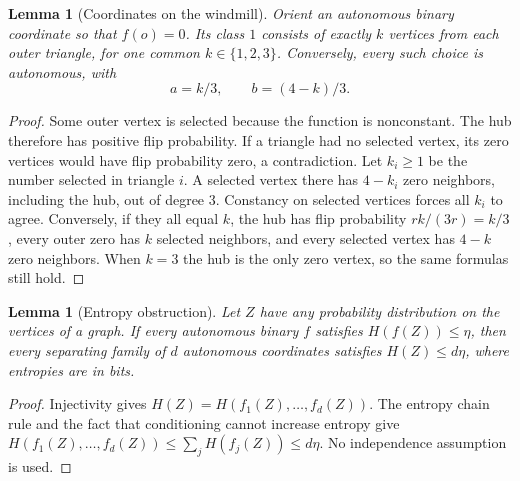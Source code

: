 \documentclass[11pt]{article}
\newtheorem{lemma}[theorem]{Lemma}
\theoremstyle{definition}
\numberwithin{equation}{section}
\begin{document}
\begin{lemma}[Coordinates on the windmill]\label{lem:windcuts}
Orient an autonomous binary coordinate so that $f(o)=0$. Its class $1$
consists of exactly $k$ vertices from each outer triangle, for one common
$k\in\{1,2,3\}$. Conversely, every such choice is autonomous, with
\[
 a=k/3,\qquad b=(4-k)/3.
\]
\end{lemma}

\begin{proof}
Some outer vertex is selected because the function is nonconstant.
The hub therefore has positive flip probability. If a triangle had no
selected vertex, its zero vertices would have flip probability zero,
a contradiction. Let $k_i\geq1$ be the number selected in triangle $i$.
A selected vertex there has $4-k_i$ zero neighbors, including the hub,
out of degree $3$. Constancy on selected vertices forces all $k_i$ to
agree. Conversely, if they all equal $k$, the hub has flip probability
$rk/(3r)=k/3$, every outer zero has $k$ selected neighbors, and every
selected vertex has $4-k$ zero neighbors. When $k=3$ the hub is the only
zero vertex, so the same formulas still hold.
\end{proof}

\begin{lemma}[Entropy obstruction]\label{lem:entropy}
Let $Z$ have any probability distribution on the vertices of a graph.
If every autonomous binary $f$ satisfies $H(f(Z))\leq\eta$, then every
separating family of $d$ autonomous coordinates satisfies
$H(Z)\leq d\eta$, where entropies are in bits.
\end{lemma}

\begin{proof}
Injectivity gives $H(Z)=H(f_1(Z),\ldots,f_d(Z))$. The entropy chain rule
and the fact that conditioning cannot increase entropy give
$H(f_1(Z),\ldots,f_d(Z))\leq\sum_j H(f_j(Z))\leq d\eta$.
No independence assumption is used.
\end{proof}
\end{document}

